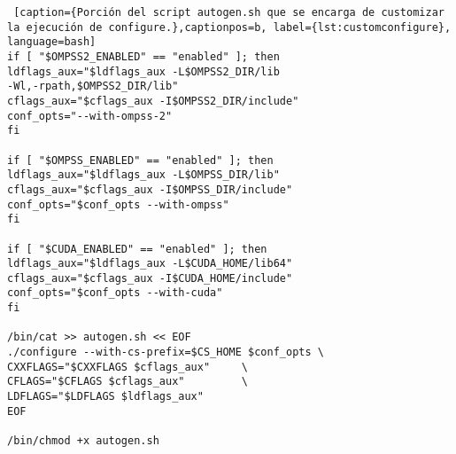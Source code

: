 \begin{minipage}{\linewidth}
\begin{lstlisting} [caption={Porción del script autogen.sh que se encarga de customizar la ejecución de configure.},captionpos=b, label={lst:customconfigure}, language=bash]                                                                                                                                               
if [ "$OMPSS2_ENABLED" == "enabled" ]; then
ldflags_aux="$ldflags_aux -L$OMPSS2_DIR/lib
-Wl,-rpath,$OMPSS2_DIR/lib"
cflags_aux="$cflags_aux -I$OMPSS2_DIR/include"
conf_opts="--with-ompss-2"
fi

if [ "$OMPSS_ENABLED" == "enabled" ]; then
ldflags_aux="$ldflags_aux -L$OMPSS_DIR/lib"
cflags_aux="$cflags_aux -I$OMPSS_DIR/include"
conf_opts="$conf_opts --with-ompss"
fi

if [ "$CUDA_ENABLED" == "enabled" ]; then
ldflags_aux="$ldflags_aux -L$CUDA_HOME/lib64"
cflags_aux="$cflags_aux -I$CUDA_HOME/include"
conf_opts="$conf_opts --with-cuda"
fi

/bin/cat >> autogen.sh << EOF
./configure --with-cs-prefix=$CS_HOME $conf_opts \ 
CXXFLAGS="$CXXFLAGS $cflags_aux"     \  
CFLAGS="$CFLAGS $cflags_aux"         \
LDFLAGS="$LDFLAGS $ldflags_aux" 
EOF

/bin/chmod +x autogen.sh
\end{lstlisting}
\end{minipage}
\par\bigskip

